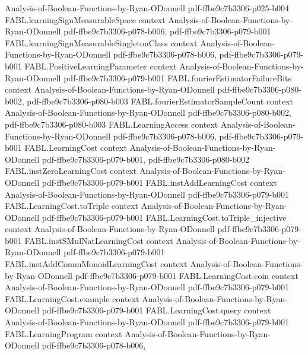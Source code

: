 \begin{theorem}
  {Analysis-of-Boolean-Functions-by-Ryan-ODonnell}
  {pdf-ffbe9c7b3306-p025-b004}
\proofstep
  {FABL.learningSignMeasurableSpace}
  {context}
  {Analysis-of-Boolean-Functions-by-Ryan-ODonnell}
  {pdf-ffbe9c7b3306-p078-b006,
    pdf-ffbe9c7b3306-p079-b001}
\proofstep
  {FABL.learningSignMeasurableSingletonClass}
  {context}
  {Analysis-of-Boolean-Functions-by-Ryan-ODonnell}
  {pdf-ffbe9c7b3306-p078-b006,
    pdf-ffbe9c7b3306-p079-b001}
\proofstep
  {FABL.PositiveLearningParameter}
  {context}
  {Analysis-of-Boolean-Functions-by-Ryan-ODonnell}
  {pdf-ffbe9c7b3306-p079-b001}
\proofstep
  {FABL.fourierEstimatorFailureBits}
  {context}
  {Analysis-of-Boolean-Functions-by-Ryan-ODonnell}
  {pdf-ffbe9c7b3306-p080-b002,
    pdf-ffbe9c7b3306-p080-b003}
\proofstep
  {FABL.fourierEstimatorSampleCount}
  {context}
  {Analysis-of-Boolean-Functions-by-Ryan-ODonnell}
  {pdf-ffbe9c7b3306-p080-b002,
    pdf-ffbe9c7b3306-p080-b003}
\proofstep
  {FABL.LearningAccess}
  {context}
  {Analysis-of-Boolean-Functions-by-Ryan-ODonnell}
  {pdf-ffbe9c7b3306-p078-b006,
    pdf-ffbe9c7b3306-p079-b001}
\proofstep
  {FABL.LearningCost}
  {context}
  {Analysis-of-Boolean-Functions-by-Ryan-ODonnell}
  {pdf-ffbe9c7b3306-p079-b001,
    pdf-ffbe9c7b3306-p080-b002}
\proofstep
  {FABL.instZeroLearningCost}
  {context}
  {Analysis-of-Boolean-Functions-by-Ryan-ODonnell}
  {pdf-ffbe9c7b3306-p079-b001}
\proofstep
  {FABL.instAddLearningCost}
  {context}
  {Analysis-of-Boolean-Functions-by-Ryan-ODonnell}
  {pdf-ffbe9c7b3306-p079-b001}
\proofstep
  {FABL.LearningCost.toTriple}
  {context}
  {Analysis-of-Boolean-Functions-by-Ryan-ODonnell}
  {pdf-ffbe9c7b3306-p079-b001}
\proofstep
  {FABL.LearningCost.toTriple_injective}
  {context}
  {Analysis-of-Boolean-Functions-by-Ryan-ODonnell}
  {pdf-ffbe9c7b3306-p079-b001}
\proofstep
  {FABL.instSMulNatLearningCost}
  {context}
  {Analysis-of-Boolean-Functions-by-Ryan-ODonnell}
  {pdf-ffbe9c7b3306-p079-b001}
\proofstep
  {FABL.instAddCommMonoidLearningCost}
  {context}
  {Analysis-of-Boolean-Functions-by-Ryan-ODonnell}
  {pdf-ffbe9c7b3306-p079-b001}
\proofstep
  {FABL.LearningCost.coin}
  {context}
  {Analysis-of-Boolean-Functions-by-Ryan-ODonnell}
  {pdf-ffbe9c7b3306-p079-b001}
\proofstep
  {FABL.LearningCost.example}
  {context}
  {Analysis-of-Boolean-Functions-by-Ryan-ODonnell}
  {pdf-ffbe9c7b3306-p079-b001}
\proofstep
  {FABL.LearningCost.query}
  {context}
  {Analysis-of-Boolean-Functions-by-Ryan-ODonnell}
  {pdf-ffbe9c7b3306-p079-b001}
\proofstep
  {FABL.LearningProgram}
  {context}
  {Analysis-of-Boolean-Functions-by-Ryan-ODonnell}
  {pdf-ffbe9c7b3306-p078-b006,
}
\end{theorem}
